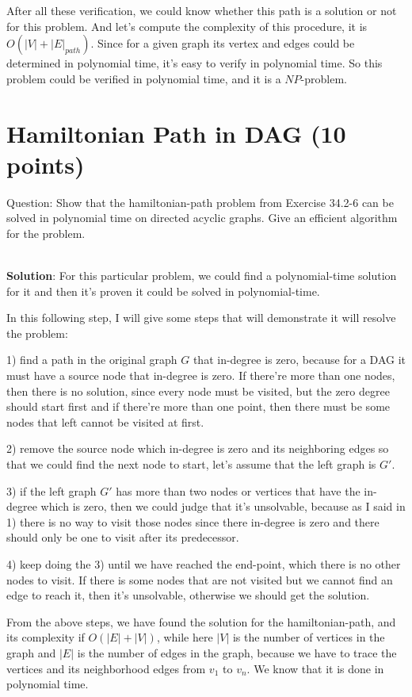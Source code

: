 \documentclass{article}
\begin{document}
After all these verification, we could know whether this path is a solution or not for this problem. And let's compute the complexity of this procedure, it is \boldmath\underline{{$O(|V| + |E|_{path})$}}\unboldmath. Since for a given graph its vertex and edges could be determined in polynomial time, it's easy to verify in polynomial time. So this problem could be verified in polynomial time, and it is a $NP$-problem.


\section{Hamiltonian Path in DAG (10 points)}
Question: Show that the hamiltonian-path problem from Exercise 34.2-6 can be solved in polynomial time on directed acyclic graphs. Give an efficient algorithm for the problem.

~\\
\textbf{Solution}:\newline
For this particular problem, we could find a polynomial-time solution for it and then it's proven it could be solved in polynomial-time.

In this following step, I will give some steps that will demonstrate it will resolve the problem:

1) find a path in the original graph $G$ that in-degree is zero, because for a DAG it must have a source node that in-degree is zero. If there're more than one nodes, then there is no solution, since every node must be visited, but the zero degree should start first and if there're more than one point, then there must be some nodes that left cannot be visited at first.

2) remove the source node which in-degree is zero and its neighboring edges so that we could find the next node to start, let's assume that the left graph is $G'$.

3) if the left graph $G'$ has more than two nodes or vertices that have the in-degree which is zero, then we could judge that it's unsolvable, because as I said in 1) there is no way to visit those nodes since there in-degree is zero and there should only be one to visit after its predecessor.

4) keep doing the 3) until we have reached the end-point, which there is no other nodes to visit. If there is some nodes that are not visited but we cannot find an edge to reach it, then it's unsolvable, otherwise we should get the solution.

From the above steps, we have found the solution for the hamiltonian-path, and its complexity if $O(|E|+|V|)$, while here $|V|$ is the number of vertices in the graph and $|E|$ is the number of edges in the graph, because we have to trace the vertices and its neighborhood edges from $v_{1}$ to $v_{n}$. We know that it is done in polynomial time.
\end{document}
